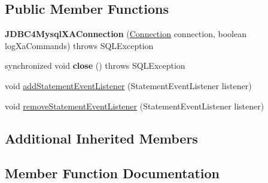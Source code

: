 \subsection*{Public Member Functions}
\begin{DoxyCompactItemize}
\item 
\mbox{\label{classcom_1_1mysql_1_1jdbc_1_1jdbc2_1_1optional_1_1_j_d_b_c4_mysql_x_a_connection_a25e6cd26a4c13272ea125edc8e5ef74a}} 
{\bfseries J\+D\+B\+C4\+Mysql\+X\+A\+Connection} (\mbox{\hyperlink{interfacecom_1_1mysql_1_1jdbc_1_1_connection}{Connection}} connection, boolean log\+Xa\+Commands)  throws S\+Q\+L\+Exception 
\item 
\mbox{\label{classcom_1_1mysql_1_1jdbc_1_1jdbc2_1_1optional_1_1_j_d_b_c4_mysql_x_a_connection_a116381b5751fd7bd6138639e7eb63520}} 
synchronized void {\bfseries close} ()  throws S\+Q\+L\+Exception 
\item 
void \mbox{\hyperlink{classcom_1_1mysql_1_1jdbc_1_1jdbc2_1_1optional_1_1_j_d_b_c4_mysql_x_a_connection_a09df93f778842b37302c30333e81142e}{add\+Statement\+Event\+Listener}} (Statement\+Event\+Listener listener)
\item 
void \mbox{\hyperlink{classcom_1_1mysql_1_1jdbc_1_1jdbc2_1_1optional_1_1_j_d_b_c4_mysql_x_a_connection_a608675d31211dc6390a8317d123045b9}{remove\+Statement\+Event\+Listener}} (Statement\+Event\+Listener listener)
\end{DoxyCompactItemize}
\subsection*{Additional Inherited Members}


\subsection{Member Function Documentation}
\mbox{\label{classcom_1_1mysql_1_1jdbc_1_1jdbc2_1_1optional_1_1_j_d_b_c4_mysql_x_a_connection_a09df93f778842b37302c30333e81142e}} 
